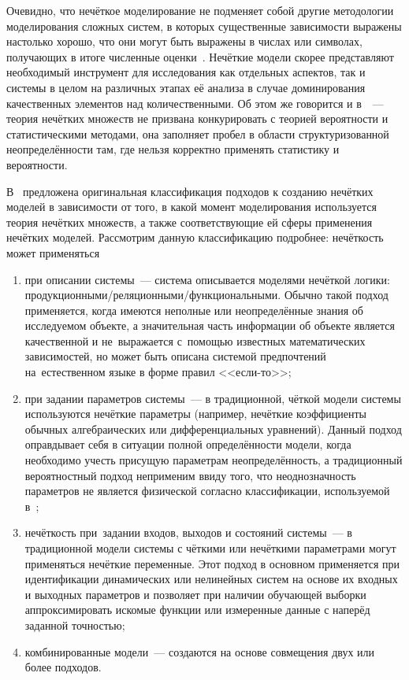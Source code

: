 Очевидно, что нечёткое моделирование не подменяет собой другие методологии моделирования сложных систем, в которых существенные зависимости выражены настолько хорошо, что они могут быть выражены в числах или символах, получающих в итоге численные оценки~\cite{Borisov_Fedulov}. Нечёткие модели скорее представляют необходимый инструмент для исследования как отдельных аспектов, так и системы в целом на различных этапах её анализа в случае доминирования качественных элементов над количественными. Об этом же говорится и в~\cite{Kaufmann}~--- теория нечётких множеств не призвана конкурировать с теорией вероятности и статистическими методами, она заполняет пробел в области структуризованной неопределённости там, где нельзя корректно применять статистику и вероятности.

В~\cite{Borisov_Fedulov} предложена оригинальная классификация подходов к созданию нечётких моделей в зависимости от того, в какой момент моделирования используется теория нечётких множеств, а также соответствующие ей сферы применения нечётких моделей. Рассмотрим данную классификацию подробнее: нечёткость может применяться
\begin{enumerate}
	\item при описании системы~--- система описывается моделями нечёткой логики: продукционными/реляционными/функциональными. Обычно такой подход применяется, когда имеются неполные или неопределённые знания об исследуемом объекте, а значительная часть информации об объекте является качественной и не~выражается с~помощью известных математических зависимостей, но может быть описана системой предпочтений на~естественном языке в форме правил <<если-то>>;
	\item при задании параметров системы~--- в традиционной, чёткой модели системы используются нечёткие параметры (например, нечёткие коэффициенты обычных алгебраических или дифференциальных уравнений). Данный подход оправдывает себя в ситуации полной определённости модели, когда необходимо учесть присущую параметрам неопределённость, а традиционный вероятностный подход неприменим ввиду того, что неоднозначность параметров не является физической согласно классификации, используемой в~\cite{Borisov_Alexeev_Msk};
	\item нечёткость при~задании входов, выходов и состояний системы~--- в традиционной модели системы с чёткими или нечёткими параметрами могут применяться нечёткие переменные. Этот подход в основном применяется при идентификации динамических или нелинейных систем на основе их входных и выходных параметров и позволяет при наличии обучающей выборки аппроксимировать искомые функции или измеренные данные с наперёд заданной точностью;
	\item комбинированные модели~--- создаются на основе совмещения двух или более подходов.
\end{enumerate}

